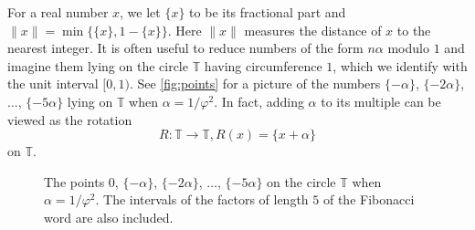 \documentclass[a4paper,fleqn]{article}
\providecommand{\norm}[1]{\lVert#1\rVert}
\newcommand{\T}{\mathbb{T}}
\begin{document}
  For a real number $x$, we let $\{x\}$ to be its fractional part and $\norm{x} = \min\{\{x\}, 1 - \{x\}\}$. Here
  $\norm{x}$ measures the distance of $x$ to the nearest integer. It is often useful to reduce numbers of the form
  $n\alpha$ modulo $1$ and imagine them lying on the circle $\T$ having circumference $1$, which we identify with the
  unit interval $[0, 1)$. See \autoref{fig:points} for a picture of the numbers $\{-\alpha\}$, $\{-2\alpha\}$,
  $\ldots$, $\{-5\alpha\}$ lying on $\T$ when $\alpha = 1/\varphi^2$. In fact, adding $\alpha$ to its multiple can be
  viewed as the rotation
  \begin{equation*}
    R\colon \T \to \T, R(x) = \{x + \alpha\}
  \end{equation*}
  on $\T$.

  \begin{figure}
   \centering
   \caption{The points $0$, $\{-\alpha\}$, $\{-2\alpha\}$, $\ldots$, $\{-5\alpha\}$ on the circle $\T$ when
            $\alpha = 1/\varphi^2$. The intervals of the factors of length $5$ of the Fibonacci word are also
            included.}
   \label{fig:points}
  \end{figure}
 
\end{document}
